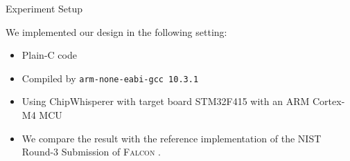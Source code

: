\begin{frame}{Experiment Setup}

We implemented our design in the following setting:
\pause

\begin{itemize}
\item Plain-C code
\pause
\item Compiled by {\tt arm-none-eabi-gcc 10.3.1}
\pause
\item Using ChipWhisperer with target board STM32F415 with an ARM Cortex-M4 MCU
\pause
\item We compare the result with the reference implementation of the NIST Round-3 Submission of \textsc{Falcon} \cite{NISTPQC-R3:FALCON20}.
\end{itemize}

\end{frame}




